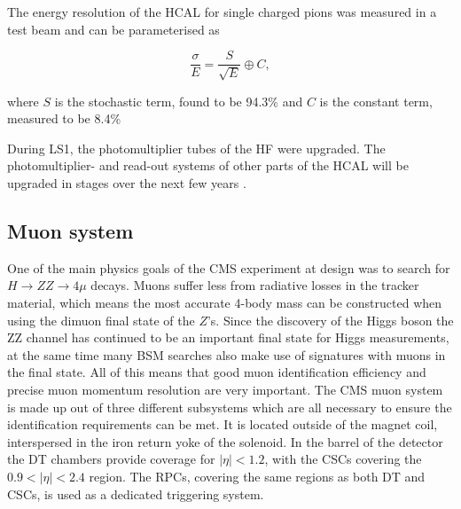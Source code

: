 The energy resolution of the \ac{HCAL} for single charged pions 
was measured in a test beam \cite{cms-hcalecal}
and can be parameterised as 

\begin{equation}\label{eqn:hcal_res}
\frac{\sigma}{E} = \frac{S}{\sqrt{E}} \oplus C,
\end{equation}

where $S$ is the stochastic term, found to be 94.3\% %
and $C$ is the constant term, measured to be 8.4\% %

During \ac{LS1}, the photomultiplier tubes of the \ac{HF} were upgraded. The photomultiplier- and
read-out systems of other parts of the \ac{HCAL} will be upgraded in stages over the
next few years \cite{cms-hcal-upgrade}.


\subsection{Muon system}
\label{sec:CMSLHC_CMS_muons}
One of the main physics goals of the \ac{CMS} experiment
at design was to search for $H\rightarrow ZZ\rightarrow 4\mu$ decays. Muons
suffer less from radiative losses in the tracker material, which means the most accurate
4-body mass can be constructed when using the dimuon final state of the $Z$'s.
Since the discovery of the Higgs boson the ZZ channel has continued to be an important
final state for Higgs measurements, at the same time many \ac{BSM} searches also make use of 
signatures with muons in the final state.
All of this means that good muon identification efficiency and precise muon momentum resolution
are very important. The \ac{CMS} muon system \cite{cms-jinst} is made up out of three different subsystems which
are all necessary to ensure the identification requirements can be met. It is located
outside of the magnet coil, interspersed in the iron return yoke of the solenoid.
In the barrel of the detector the \ac{DT} chambers provide coverage for $|\eta|<1.2$, with
the \ac{CSCs} covering the $0.9<|\eta|<2.4$ region. The \ac{RPCs}, covering the same
regions as both \ac{DT} and \ac{CSCs}, is used as a dedicated triggering system.

